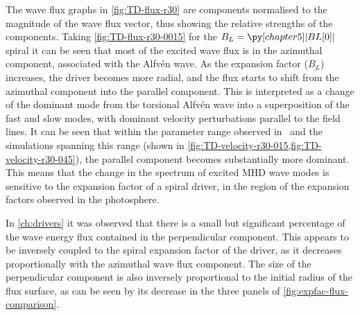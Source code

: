 The wave flux graphs in \cref{fig:TD-flux-r30} are components normalised to the magnitude of the wave flux vector, thus showing the relative strengths of the components.
Taking \cref{fig:TD-flux-r30-0015} for the $B_L=\py[chapter5]|BL[0]|$ spiral it can be seen that most of the excited wave flux is in the azimuthal component, associated with the Alfv\'en wave.
As the expansion factor ($B_L$) increases, the driver becomes more radial, and the flux starts to shift from the azimuthal component into the parallel component.
This is interpreted as a change of the dominant mode from the torsional Alfv\'en wave into a superposition of the fast and slow modes, with dominant velocity perturbations parallel to the field lines.
It can be seen that within the parameter range observed in~\cite{bonet2008} and the simulations spanning this range (shown in \cref{fig:TD-velocity-r30-015,fig:TD-velocity-r30-045}), the parallel component becomes substantially more dominant.
This means that the change in the spectrum of excited MHD wave modes is sensitive to the expansion factor of a spiral driver, in the region of the expansion factors observed in the photosphere.

In \cref{ch:drivers} it was observed that there is a small but significant percentage of the wave energy flux contained in the perpendicular component.
This appears to be inversely coupled to the spiral expansion factor of the driver, as it decreases proportionally with the azimuthal wave flux component.
The size of the perpendicular component is also inversely proportional to the initial radius of the flux surface, as can be seen by its decrease in the three panels of \cref{fig:expfac-flux-comparison}.


